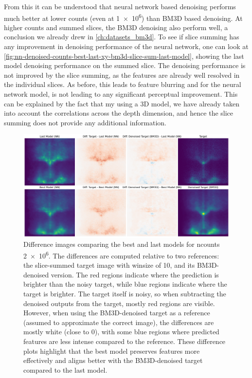 From this it can be understood that neural network based denoising performs much better at lower counts (even at \num{1e6}) than BM3D based denoising. At higher counts and summed slices, the BM3D denoising also perform well, a conclusion we already drew in \cref{ch:datasets_bm3d}. To see if slice summing has any improvement in denoising performance of the neural network, one can look at  \cref{fig:nn-denoised-counts-best-last-xy-bm3d-slice-sum-last-model}, showing the last model denoising performance on the summed slice. The denoising performance is not improved by the slice summing, as the features are already well resolved in the individual slices. As before, this leads to feature blurring and for the neural network model, is not leading to any significant perceptual improvement. This can be explained by the fact that my using a 3D model, we have already taken into account the correlations across the depth dimension, and hence the slice summing does not provide any additional information.

\begin{figure}
    \centering
    \includegraphics[width=1\linewidth]{images/nn_diff_plots_2M.pdf}
    \caption{Difference images comparing the best and last models for \gls{ncounts} \num{2e6}. The differences are computed relative to two references: the slice-summed target image with \gls{winsize} of \num{10}, and its BM3D-denoised version. The red regions indicate where the prediction is brighter than the noisy target, while blue regions indicate where the target is brighter. The target itself is noisy, so when subtracting the denoised outputs from the target, mostly red regions are visible. However, when using the BM3D-denoised target as a reference (assumed to approximate the correct image), the differences are mostly white (close to 0), with some blue regions where predicted features are less intense compared to the reference. These difference plots highlight that the best model preserves features more effectively and aligns better with the BM3D-denoised target compared to the last model.}
    \label{fig:nn_diff_plots_2M} 
\end{figure}

